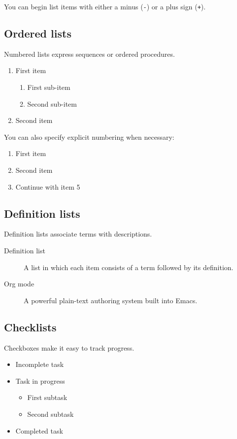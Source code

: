 \documentclass{mcreport}
\begin{document}
You can begin list items with either a minus (\lstinline|-|) or a plus sign (\lstinline|+|).
\subsection{Ordered lists}
\label{sec:org11bd972}

Numbered lists express sequences or ordered procedures.

\begin{enumerate}
\item First item
\begin{enumerate}
\item First sub-item
\item Second sub-item
\end{enumerate}
\item Second item
\end{enumerate}

You can also specify explicit numbering when necessary:

\begin{enumerate}
\setcounter{enumi}{0}
\item First item
\setcounter{enumi}{1}
\item Second item
\setcounter{enumi}{4}
\item Continue with item 5
\end{enumerate}
\subsection{Definition lists}
\label{sec:orgae7629a}

Definition lists associate terms with descriptions.

\begin{description}
\item[{Definition list}] A list in which each item consists of a term followed by its definition.

\item[{Org mode}] A powerful plain-text authoring system built into Emacs.
\end{description}
\subsection{Checklists}
\label{sec:orga85222c}

Checkboxes make it easy to track progress.

\begin{itemize}
\item[{$\square$}] Incomplete task
\item[{$\boxminus$}] Task in progress
\begin{itemize}
\item[{$\boxtimes$}] First subtask
\item[{$\square$}] Second subtask
\end{itemize}
\item[{$\boxtimes$}] Completed task
\end{itemize}
\end{document}

